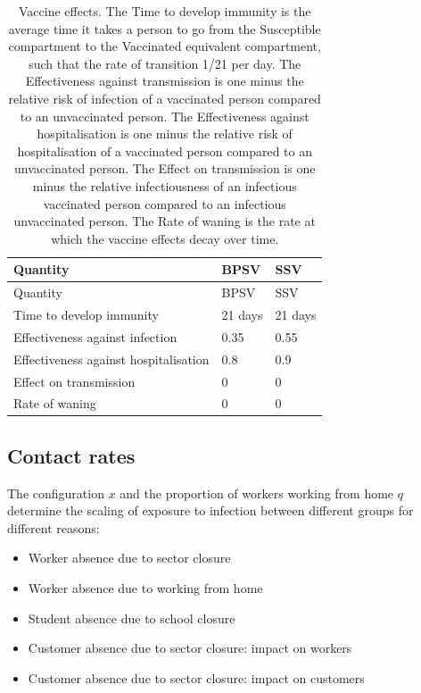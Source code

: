\documentclass[
]{article}
\providecommand{\tightlist}{%
  \setlength{\itemsep}{0pt}\setlength{\parskip}{0pt}}
\begin{document}
\begin{longtable}[]{@{}lll@{}}
\caption{\label{tab:vaccineeffects} Vaccine effects. The Time to develop immunity is the average time it takes a person to go from the Susceptible compartment to the Vaccinated equivalent compartment, such that the rate of transition 1/21 per day. The Effectiveness against transmission is one minus the relative risk of infection of a vaccinated person compared to an unvaccinated person. The Effectiveness against hospitalisation is one minus the relative risk of hospitalisation of a vaccinated person compared to an unvaccinated person. The Effect on transmission is one minus the relative infectiousness of an infectious vaccinated person compared to an infectious unvaccinated person. The Rate of waning is the rate at which the vaccine effects decay over time.}\tabularnewline
\toprule\noalign{}
Quantity & BPSV & SSV \\
\midrule\noalign{}
\endfirsthead
\toprule\noalign{}
Quantity & BPSV & SSV \\
\midrule\noalign{}
\endhead
\bottomrule\noalign{}
\endlastfoot
Time to develop immunity & 21 days & 21 days \\
Effectiveness against infection & 0.35 & 0.55 \\
Effectiveness against hospitalisation & 0.8 & 0.9 \\
Effect on transmission & 0 & 0 \\
Rate of waning & 0 & 0 \\
\end{longtable}

\subsection{Contact rates}\label{contact-rates}

The configuration \(x\) and the proportion of workers working from home \(q\) determine the scaling of exposure to infection between different groups for different reasons:

\begin{itemize}
\tightlist
\item
  Worker absence due to sector closure
\item
  Worker absence due to working from home
\item
  Student absence due to school closure
\item
  Customer absence due to sector closure: impact on workers
\item
  Customer absence due to sector closure: impact on customers
\end{itemize}
\end{document}

